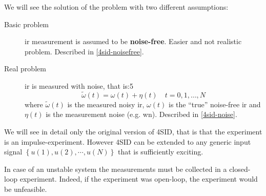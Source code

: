 We will see the solution of the problem with two different assumptions:
\begin{description}
    \item [Basic problem] \gls{ir} measurement is assumed to be \textbf{noise-free}. Easier and not realistic problem. Described in \ref{4sid-noisefree}.
    \item [Real problem] \gls{ir} is measured with noise, that is:5
    \[ \widetilde{\omega}(t) = \omega(t) + \eta(t) \quad t = 0, 1,\dots, N \] where
        $\widetilde{\omega}(t)$ is the measured noisy \gls{ir},
        $\omega(t)$ is the ``true'' noise-free \gls{ir} and
        $\eta(t)$ is the measurement noise (e.g. \gls{wn}). Described in \ref{4sid-noise}.
\end{description}

\begin{rem}
    We will see in detail only the original version of 4SID, that is that the experiment is an impulse-experiment.
    However 4SID can be extended to any generic input signal $\left\{ u(1), u(2), \cdots, u(N) \right\}$ that is sufficiently exciting.
\end{rem}

\begin{rem}
    In case of an unstable system the measurements must be collected in a closed-loop experiment.
    Indeed, if the experiment was open-loop, the experiment would be unfeasible.

    \begin{figure}[H]
        \centering
    \end{figure}
\end{rem}

